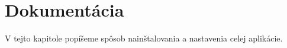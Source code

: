 \chapter{Dokumentácia}
\label{kap:dokumentacia}

V tejto kapitole popíšeme spôsob nainštalovania a nastavenia celej aplikácie.